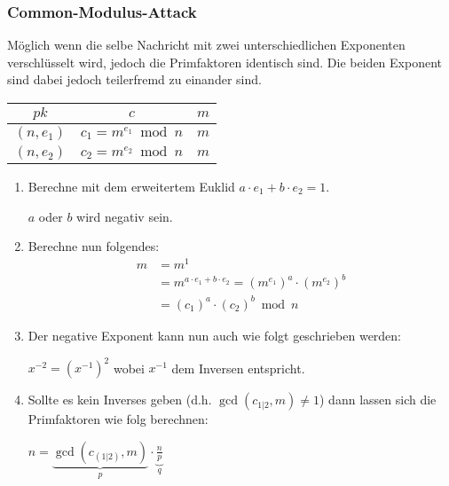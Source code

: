\documentclass[a4paper,landscape]{article}
\newcommand{\plaint}{\ensuremath{m}}
\newcommand{\ciphert}{\ensuremath{c}}
\newcommand{\pkey}{\ensuremath{pk}}
\begin{document}
\begin{multicols*}{4}
	\subsubsection*{Common-Modulus-Attack}
	Möglich wenn die selbe Nachricht mit zwei unterschiedlichen Exponenten verschlüsselt wird,
	jedoch die Primfaktoren identisch sind. Die beiden Exponent sind dabei jedoch teilerfremd
	zu einander sind.
	\begin{center}
		\begin{tabular}[t]{ccc}
			\pkey        & \ciphert                    & \plaint \\\hline
			$(n, e_{1})$ & $c_{1} = m^{e_{1}} \bmod n$ & $m$     \\
			$(n, e_{2})$ & $c_{2} = m^{e_{2}} \bmod n$ & $m$     \\\hline
		\end{tabular}
	\end{center}
	\begin{enumerate}
		\item Berechne mit dem erweitertem Euklid $a \cdot e_{1} + b \cdot e_{2} = 1$. \par
		      $a$ oder $b$ wird negativ sein.
		\item Berechne nun folgendes:
		      \begin{align*}
			      m & = m^{1}                                                                                           \\
			        & = m^{a \cdot e_{1} + b \cdot e_{2}} = \left(m^{e_{1}}\right)^{a} \cdot \left(m^{e_{2}}\right)^{b} \\
			        & = \left(c_{1}\right)^{a} \cdot \left(c_{2}\right)^{b} \bmod n
		      \end{align*}
		\item Der negative Exponent kann nun auch wie folgt geschrieben werden: \par
		      $x^{-2} = \left(x^{-1}\right)^{2}$ wobei $x^{-1}$ dem Inversen entspricht.
		\item Sollte es kein Inverses geben (d.h. $\gcd(c_{1|2},m) \neq 1$) dann lassen
		      sich die Primfaktoren wie folg berechnen: \par
		      \(
		      n = \underbrace{\gcd(c_{(1|2)},m)}_{p} \cdot \underbrace{\frac{n}{p}}_{q}
		      \)
	\end{enumerate}


\end{multicols*}
\end{document}

